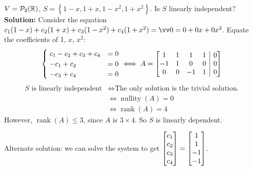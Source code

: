 \begin{example}
    $V = \mathcal{P}_2({\mathbb{R}})$, $S = \left\{  1-x, 1+x, 1-x^2, 1+x^2 \right\}$. Is $S$ linearly independent? \\
    \textbf{Solution: }
    Consider the equation $c_1(1-x) + c_2(1+x) + c_3(1-x^2) + c_4(1+x^2) = \vzero = 0 + 0x + 0x^2$.
    Equate the coefficients of 1, $x$, $x^2$:
    \[\begin{cases}
        \; c_1 - c_2 + c_3 + c_4 &= 0 \\ 
        \; -c_1 + c_2 &= 0 \\
        \; -c_3 + c_4 &= 0
      \end{cases}
      \iff A =
      \left[
        \begin{array}{@{}cccc|c@{}}
            1 & 1 & 1 & 1 & 0 \\
            -1 & 1 & 0 & 0 & 0 \\
            0 & 0 & -1 & 1 & 0
        \end{array}
      \right]
    \]
    \vspace{-8mm}
    \begin{align*}
        S \text{ is linearly independent} &\iff \text{The only solution is the trivial solution.} \\
        &\iff \operatorname{nullity}{(A)} = 0 \\
        &\iff \operatorname{rank}{(A)} = 4
    \end{align*}
    However, $\operatorname{rank}{(A)} \leq 3$, since $A$ is $3 \times 4$. So $S$ is linearly dependent.

    Alternate solution: we can solve the system to get $\begin{bmatrix} c_1 \\ c_2 \\ c_3 \\ c_4 \end{bmatrix} = \begin{bmatrix} 1 \\ 1 \\ -1 \\ -1 \end{bmatrix}$.
\end{example}

